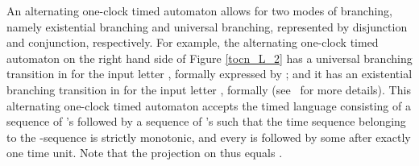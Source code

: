 \documentclass{CSML}
\theoremstyle{plain}\newtheorem{theorem}[thm]{Theorem}
\theoremstyle{plain}\newtheorem{corollary}[thm]{Corollary}
\theoremstyle{plain}\newtheorem{example}[thm]{Example}
\theoremstyle{plain}\newtheorem{lemma}[thm]{Lemma}
\theoremstyle{plain}\newtheorem{remark}[thm]{Remark}
\begin{document}
An alternating one-clock timed automaton allows for two modes of branching, namely existential branching and universal branching, represented by disjunction and conjunction, respectively. 
For example, the alternating one-clock timed automaton on the right hand side of Figure \ref{tocn_L_2} has a universal branching transition in  for the input letter , formally expressed by ; and it has an existential branching transition in  for the input letter , formally   (see~\cite{DBLP:conf/lics/OuaknineW05} for more details). 
This alternating one-clock timed automaton accepts the timed language consisting of a sequence of 's followed by a sequence of 's such that the time sequence belonging to the -sequence is strictly monotonic, and every  is followed by some  after exactly one time unit. Note that the projection on  thus equals .  
\end{document}
